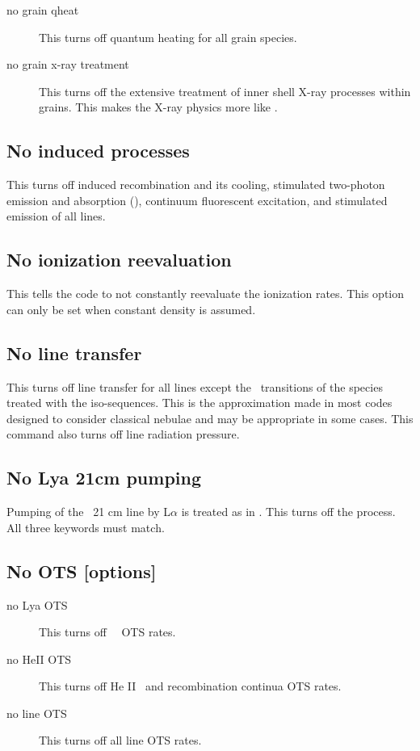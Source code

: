 \begin{description}
\item[no grain qheat]   This turns off quantum heating for all grain species.

\item[no grain x-ray treatment]  This turns off the
extensive treatment of inner
shell X-ray processes within grains.
This makes the X-ray physics more
like \citet{Weingartner2001a}.
\end{description}

\subsection{No induced processes}

This turns off induced recombination and its cooling, stimulated
two-photon emission and absorption (\citealp{Bottorff2006}), continuum
fluorescent excitation, and stimulated emission of all lines.

\subsection{No ionization reevaluation}

This tells the code to not constantly reevaluate the ionization rates.
This option can only be set when constant density is assumed.

\subsection{No line transfer}

This turns off line transfer for all lines except the
\la\ transitions
of the species treated with the iso-sequences.
This is the approximation
made in most codes designed to consider classical nebulae and may be
appropriate in some cases.
This command also turns off line radiation pressure.

\subsection{No Lya 21cm pumping}

Pumping of the \hi\ 21 cm line by L$\alpha $ is treated
as in \citet{Deguchi1985}.
This turns off the process.
All three keywords must match.

\subsection{No OTS [options]}
\begin{description}
\item[no Lya OTS]  This turns off \hi\ \la\ OTS rates.

\item[no HeII OTS]  This turns off He II \la\ and recombination continua OTS rates.

\item[no line OTS]  This turns off all line OTS rates.
\end{description}

